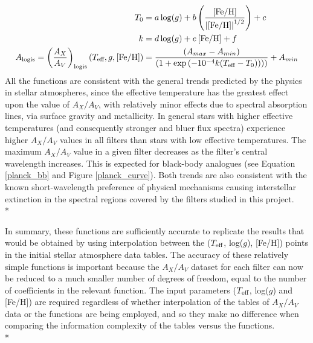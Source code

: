 \documentclass[12pt, a4paper]{report}
\begin{document}
\begin{align}
T_{\textnormal{0}} &= a\log(g) + b\left(\frac{\left[\textnormal{Fe/H}\right]}{\left|\left[\textnormal{Fe/H}\right]\right|^{1/2}}\right) + c \label{T0_eq}\\
k &= d\log(g) + e\left[\textnormal{Fe/H}\right] + f \label{decay_const_eq}\\
A_{\textnormal{logis}} = \left(\frac{A_{X}}{A_{V}}\right)_{\textnormal{logis}}(T_{\textnormal{eff}},g,\left[\textnormal{Fe/H}\right]) &= \frac{(A_{max}-A_{min})}{( 1 + \exp{(-10^{-4} k(T_{\textnormal{eff}}-T_{\textnormal{0}})) ) )}} + A_{min} \label{A_logis_UV}
\end{align}
All the functions are consistent with the general trends predicted by the physics in stellar atmospheres, since the effective temperature has the greatest effect upon the value of $A_{X}/A_{V}$, with relatively minor effects due to spectral absorption lines, via surface gravity and metallicity. In general stars with higher effective temperatures (and consequently stronger and bluer flux spectra) experience higher $A_{X}/A_{V}$ values in all filters than stars with low effective temperatures. The maximum $A_{X}/A_{V}$ value in a given filter decreases as the filter's central wavelength increases. This is expected for black-body analogues (see Equation \ref{planck_bb} and Figure \ref{planck_curve}). Both trends are also consistent with the known short-wavelength preference of physical mechanisms causing interstellar extinction in the spectral regions covered by the filters studied in this project.\\*

In summary, these functions are sufficiently accurate to replicate the results that would be obtained by using interpolation between the ($T_{\textnormal{eff}}$, log($g$), [Fe/H]) points in the initial stellar atmosphere data tables. The accuracy of these relatively simple functions is important because the $A_{X}/A_{V}$ dataset for each filter can now be reduced to a much smaller number of degrees of freedom, equal to the number of coefficients in the relevant function. The input parameters ($T_{\textnormal{eff}}$, log($g$) and [Fe/H]) are required regardless of whether interpolation of the tables of $A_{X}/A_{V}$ data or the functions are being employed, and so they make no difference when comparing the information complexity of the tables versus the functions.\\*
\end{document}

